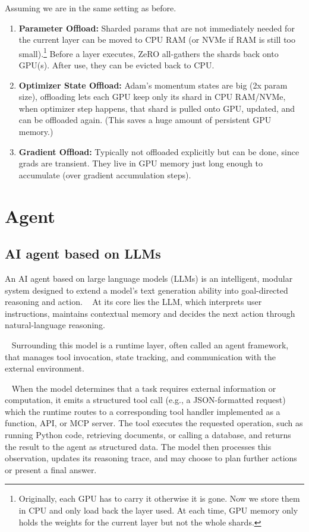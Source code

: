 \documentclass[11pt]{article}  %
\begin{document}
Assuming we are in the same setting as before.
\begin{enumerate}
  \item \textbf{Parameter Offload:} Sharded params that are not immediately needed for the current layer can be moved to CPU RAM (or NVMe if RAM is still too small).\footnote{Originally, each GPU has to carry it otherwise it is gone. Now we store them in CPU and only load back the layer used. At each time, GPU memory only holds the weights for the current layer but not the whole shards.}
  Before a layer executes, ZeRO all-gathers the shards back onto GPU(s). After use, they can be evicted back to CPU.

  \item \textbf{Optimizer State Offload:} Adam's momentum states are big (2x param size), offloading lets each GPU keep only its shard in CPU RAM/NVMe, when optimizer step happens, that shard is pulled onto GPU, updated, and can be offloaded again. (This saves a huge amount of persistent GPU memory.)
  
  \item \textbf{Gradient Offload:} Typically not offloaded explicitly but can be done, since grads are transient. They live in GPU memory just long enough to accumulate (over gradient accumulation steps).
\end{enumerate}



\section{Agent}

\subsection{AI agent based on LLMs}
An AI agent based on large language models (LLMs) is an intelligent, modular system designed to extend a model's text generation ability into goal-directed reasoning and action.
\textbullet~ At its core lies the LLM, which interprets user instructions, maintains contextual memory and decides the next action through natural-language reasoning.

\textbullet~ Surrounding this model is a runtime layer, often called an agent framework, that manages tool invocation, state tracking, and communication with the external environment.

\textbullet~ When the model determines that a task requires external information or computation, it emits a structured tool call (e.g., a JSON-formatted request) which the runtime routes to a corresponding tool handler implemented as a function, API, or MCP server.
The tool executes the requested operation, such as running Python code, retrieving documents, or calling a database, and returns the result to the agent as structured data.
The model then processes this observation, updates its reasoning trace, and may choose to plan further actions or present a final answer.
\end{document}

